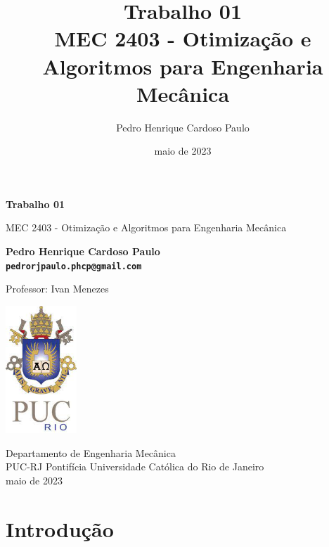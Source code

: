 \documentclass[10pt, a4paper]{article}
\begin{document}
\def\TITLE{Trabalho 01}
\def\DISCIPLINE{MEC 2403 - Otimização e Algoritmos para Engenharia Mecânica}
\def\PROFESSOR{Ivan Menezes}
\def\AUTHOR{Pedro Henrique Cardoso Paulo}
\def\CONTACT{pedrorjpaulo.phcp@gmail.com}
\def\DATE{maio de 2023}

\title{\textbf{\TITLE} \\ \DISCIPLINE}
\author{\AUTHOR}
\date{\DATE}

\begin{titlepage}
      \begin{center}
          \vspace*{1cm}

          \Huge
          \textbf{\TITLE}

          \vspace{0.5cm}
          \LARGE
          \DISCIPLINE

          \vspace{1.5cm}

          \textbf{\AUTHOR \\ {\tt \CONTACT}}

          \vfill
          Professor: \PROFESSOR

          \vspace{0.8cm}

          \includegraphics[width=0.2\textwidth]{../general/puc.jpg}

          \Large
          Departamento de Engenharia Mecânica\\
          PUC-RJ Pontifícia Universidade Católica do Rio de Janeiro\\
          \DATE

      \end{center}
  \end{titlepage}

\maketitle

\section{Introdução}
\end{document}

